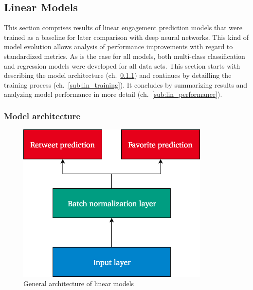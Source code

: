 \subsection{Linear Models}
\label{sec:linear_models}

This section comprises results of linear engagement prediction models that
were trained as a baseline for later comparison with deep neural networks.
This kind of model evolution allows analysis of performance improvements
with regard to standardized metrics.
As is the case for all models, both multi-class classification and regression
models were developed for all data sets.
This section starts with describing the model architecture (ch.~\ref{sub:lin_architecture}) and continues by detailling the training process (ch.~\ref{sub:lin_training}).
It concludes by summarizing results and analyzing model performance in more detail
(ch.~\ref{sub:lin_performance}).

\subsubsection{Model architecture}
\label{sub:lin_architecture}

\begin{figure}[h]
  \includegraphics[height=8cm]{img/linear_model_architecture}
  \caption{General architecture of linear models}
\label{fig:linear_model_architecture}
\end{figure}

